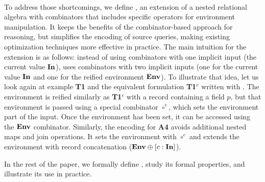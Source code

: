 \paragraph*{\NRAEnv}

To address those shortcomings, we define \NRAEnv, an extension of a
nested relational algebra with combinators that includes specific
operators for environment manipulation. It keeps the benefits of the
combinator-based approach for reasoning, but simplifies the encoding
of source queries, making existing optimization techniques more
effective in practice. The main intuition for the extension is as
follows: instead of using combinators with one implicit input (the
current value $\textup{\textbf{{In}}}$), \NRAEnv uses combinators with two implicit
inputs (one for the current value $\textup{\textbf{{In}}}$ and one for the reified
environment $\textup{\textbf{{Env}}}$). To illustrate that idea, let us look again at
example \textbf{T1} and the equivalent formulation \textbf{T1$^e$}
written with \NRAEnv. The environment is reified similarly as
\textbf{T1$^c$} with a record containing a field $p$, but that
environment is passed using a special combinator $\circ^e$, which sets
the environment part of the input. Once the environment has been set,
it can be accessed using the $\textup{\textbf{{Env}}}$ combinator. Similarly, the
encoding for \textbf{A4} avoids additional nested maps and join
operations. It sets the environment with $\circ^e$ and extends the
environment with record concatenation ($\textup{\textbf{{Env}}} \oplus [c:\textup{\textbf{{In}}}]$).

In the rest of the paper, we formally define \NRAEnv, study its formal
properties, and illustrate its use in practice.


